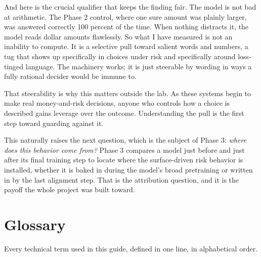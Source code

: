 \documentclass[11pt]{article}
\begin{document}
And here is the crucial qualifier that keeps the finding fair. The model is not bad at arithmetic. The
Phase 2 control, where one sure amount was plainly larger, was answered correctly 100 percent of the
time. When nothing distracts it, the model reads dollar amounts flawlessly. So what I have measured is
not an inability to compute. It is a selective pull toward salient words and numbers, a tug that shows
up specifically in choices under risk and specifically around loss-tinged language. The machinery works;
it is just steerable by wording in ways a fully rational decider would be immune to.

That steerability is why this matters outside the lab. As these systems begin to make real
money-and-risk decisions, anyone who controls how a choice is described gains leverage over the outcome.
Understanding the pull is the first step toward guarding against it.

This naturally raises the next question, which is the subject of Phase 3: \emph{where does this behavior
come from?} Phase 3 compares a model just before and just after its final training step to locate where
the surface-driven risk behavior is installed, whether it is baked in during the model's broad
pretraining or written in by the last alignment step. That is the attribution question, and it is the
payoff the whole project was built toward.

\section{Glossary}

Every technical term used in this guide, defined in one line, in alphabetical order.
\end{document}

